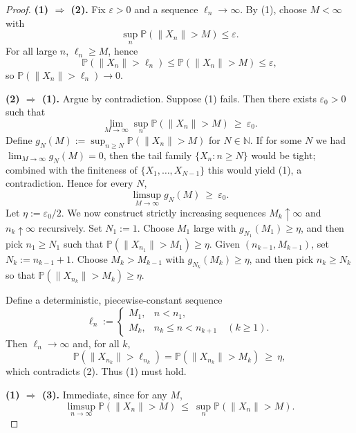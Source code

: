 \documentclass[12pt]{article}
\renewcommand{\(}{\left(}%
\renewcommand{\)}{\right)}%
\renewcommand{\[}{\left[}%
\renewcommand{\]}{\right]}%
\newtheorem{proof}{Proof.}}
\begin{document}
\begin{proof}
\textbf{(1) $\Rightarrow$ (2).}
Fix $\varepsilon>0$ and a sequence $\ell_n\to\infty$. By (1), choose $M<\infty$ with
\begin{equation*}
\sup_{n}\mathbb{P}(\|X_n\|>M)\le\varepsilon.
\end{equation*}
For all large $n$, $\ell_n\ge M$, hence
\begin{equation*}
\mathbb{P}(\|X_n\|>\ell_n)\le \mathbb{P}(\|X_n\|>M)\le \varepsilon,
\end{equation*}
so $\mathbb{P}(\|X_n\|>\ell_n)\to0$.

\smallskip
\textbf{(2) $\Rightarrow$ (1).}
Argue by contradiction. Suppose (1) fails. Then there exists $\varepsilon_0>0$ such that
\begin{equation*}
\lim_{M\to\infty}\sup_{n}\mathbb{P}(\|X_n\|>M)\ \ge\ \varepsilon_0.
\end{equation*}
Define $g_N(M):=\sup_{n\ge N}\mathbb{P}(\|X_n\|>M)$ for $N\in\mathbb{N}$. If for some $N$ we had $\lim_{M\to\infty}g_N(M)=0$, then the tail family $\{X_n:n\ge N\}$ would be tight; combined with the finiteness of $\{X_1,\dots,X_{N-1}\}$ this would yield (1), a contradiction. Hence for every $N$,
\begin{equation*}
\limsup_{M\to\infty} g_N(M)\ \ge\ \varepsilon_0.
\end{equation*}
Let $\eta:=\varepsilon_0/2$. We now construct strictly increasing sequences $M_k\uparrow\infty$ and $n_k\uparrow\infty$ recursively. Set $N_1:=1$. Choose $M_1$ large with $g_{N_1}(M_1)\ge \eta$, and then pick $n_1\ge N_1$ such that $\mathbb{P}(\|X_{n_1}\|>M_1)\ge\eta$.
Given $(n_{k-1},M_{k-1})$, set $N_k:=n_{k-1}+1$. Choose $M_k>M_{k-1}$ with $g_{N_k}(M_k)\ge\eta$, and then pick $n_k\ge N_k$ so that $\mathbb{P}(\|X_{n_k}\|>M_k)\ge\eta$.

Define a deterministic, piecewise-constant sequence
\begin{equation*}
\ell_n:=\begin{cases}
M_1, & n<n_1,\\
M_k, & n_k\le n<n_{k+1}\quad (k\ge1).
\end{cases}
\end{equation*}
Then $\ell_n\to\infty$ and, for all $k$,
\begin{equation*}
\mathbb{P}(\|X_{n_k}\|>\ell_{n_k})
=\mathbb{P}(\|X_{n_k}\|>M_k)\ \ge\ \eta,
\end{equation*}
which contradicts (2). Thus (1) must hold.

\smallskip
\textbf{(1) $\Rightarrow$ (3).}
Immediate, since for any $M$,
\begin{equation*}
\limsup_{n\to\infty}\mathbb{P}(\|X_n\|>M)\ \le\ \sup_{n}\mathbb{P}(\|X_n\|>M).
\end{equation*}


\end{proof}
\end{document}
